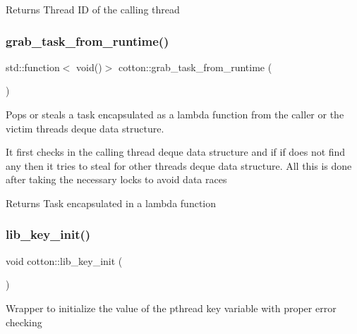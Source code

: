 \begin{DoxyReturn}{Returns}
Thread ID of the calling thread 
\end{DoxyReturn}
\mbox{\label{cotton-runtime_8h_file_afaca8aa46092d066bf1d996ae09fb83d}} 
\subsubsection{\texorpdfstring{grab\+\_\+task\+\_\+from\+\_\+runtime()}{grab\_task\_from\_runtime()}}
{\footnotesize\ttfamily std\+::function$<$ void()$>$ cotton\+::grab\+\_\+task\+\_\+from\+\_\+runtime (\begin{DoxyParamCaption}{ }\end{DoxyParamCaption})}

Pops or steals a task encapsulated as a lambda function from the caller or the victim thread\textquotesingle{}s deque data structure.

It first checks in the calling thread deque data structure and if if does not find any then it tries to steal for other threads\textquotesingle{} deque data structure. All this is done after taking the necessary locks to avoid data races

\begin{DoxyReturn}{Returns}
Task encapsulated in a lambda function 
\end{DoxyReturn}
\mbox{\label{cotton-runtime_8h_file_a4ea9036584fa3bd86fe8626dc05d295f}} 
\subsubsection{\texorpdfstring{lib\+\_\+key\+\_\+init()}{lib\_key\_init()}}
{\footnotesize\ttfamily void cotton\+::lib\+\_\+key\+\_\+init (\begin{DoxyParamCaption}{ }\end{DoxyParamCaption})}

Wrapper to initialize the value of the pthread key variable with proper error checking

